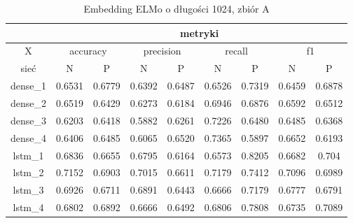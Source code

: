 \begin{table}[p]  \centering
    \caption{Embedding ELMo o długości 1024, zbiór A}
    \label{tab:wyniki_elmo_A}
    \begin{tabular}{|c|c|c|c|c|c|c|c|c|}    \hline
                 & \multicolumn{8}{c|}{metryki}                                                                                                                               \\ \hline
        X        & \multicolumn{2}{c|}{accuracy} & \multicolumn{2}{c|}{precision} & \multicolumn{2}{c|}{recall} & \multicolumn{2}{c|}{f1}                                     \\ \hline
        sieć     & N                             & P                              & N                           & P                       & N      & P      & N      & P      \\ \hline
        dense\_1 & 0.6531                        & 0.6779                         & 0.6392                      & 0.6487                  & 0.6526 & 0.7319 & 0.6459 & 0.6878 \\ \hline
        dense\_2 & 0.6519                        & 0.6429                         & 0.6273                      & 0.6184                  & 0.6946 & 0.6876 & 0.6592 & 0.6512 \\ \hline
        dense\_3 & 0.6203                        & 0.6418                         & 0.5882                      & 0.6261                  & 0.7226 & 0.6480 & 0.6485 & 0.6368 \\ \hline
        dense\_4 & 0.6406                        & 0.6485                         & 0.6065                      & 0.6520                  & 0.7365 & 0.5897 & 0.6652 & 0.6193 \\ \hline
        lstm\_1  & 0.6836                        & 0.6655                         & 0.6795                      & 0.6164                  & 0.6573 & 0.8205 & 0.6682 & 0.704  \\ \hline
        lstm\_2  & 0.7152                        & 0.6903                         & 0.7015                      & 0.6611                  & 0.7179 & 0.7412 & 0.7096 & 0.6989 \\ \hline
        lstm\_3  & 0.6926                        & 0.6711                         & 0.6891                      & 0.6443                  & 0.6666 & 0.7179 & 0.6777 & 0.6791 \\ \hline
        lstm\_4  & 0.6802                        & 0.6892                         & 0.6666                      & 0.6492                  & 0.6806 & 0.7808 & 0.6735 & 0.7089 \\ \hline

\end{tabular}
\end{table}
